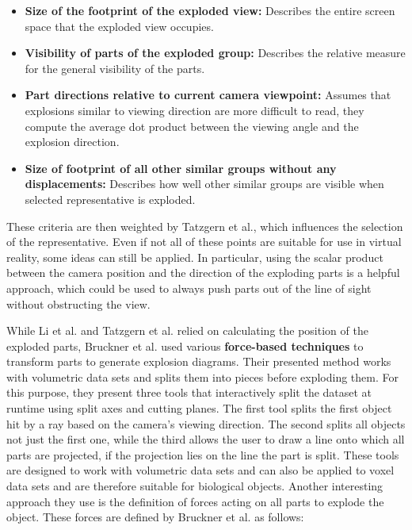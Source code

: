 \begin{itemize}
	\item \textbf{Size of the footprint of the exploded view:} Describes the entire screen space that the exploded view occupies.
	\item \textbf{Visibility of parts of the exploded group:} Describes the relative measure for the general visibility of the parts.
	\item \textbf{Part directions relative to current camera viewpoint:} Assumes that explosions similar to viewing direction are more difficult to read, they compute the average dot product between the viewing angle and the explosion direction.
	\item \textbf{Size of footprint of all other similar groups without any displacements:} Describes how well other similar groups are visible when selected representative is exploded.
\end{itemize}

These criteria are then weighted by Tatzgern et al., which influences the selection of the representative.
Even if not all of these points are suitable for use in virtual reality, some ideas can still be applied.
In particular, using the scalar product between the camera position and the direction of the exploding parts is a helpful approach, which could be used to always push parts out of the line of sight without obstructing the view.

While Li et al. and Tatzgern et al. relied on calculating the position of the exploded parts, Bruckner et al. used various \textbf{force-based techniques} to transform parts to generate explosion diagrams.\cite{Bruckner_2006}
Their presented method works with volumetric data sets and splits them into pieces before exploding them. 
For this purpose, they present three tools that interactively split the dataset at runtime using split axes and cutting planes. 
The first tool splits the first object hit by a ray based on the camera's viewing direction. The second splits all objects not just the first one, while the third allows the user to draw a line onto which all parts are projected, if the projection lies on the line the part is split. 
These tools are designed to work with volumetric data sets and can also be applied to voxel data sets and are therefore suitable for biological objects.
Another interesting approach they use is the definition of forces acting on all parts to explode the object.
These forces are defined by Bruckner et al. as follows:

